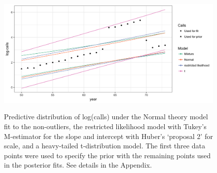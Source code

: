 \documentclass[12pt]{article}
\def\bth{\mbox{\boldmath $\theta$}}
\newcommand{\by}{\mbox{\boldmath $y$}}
\begin{document}
\begin{figure}
\centering
{\includegraphics[width = 6in]{figs/calls_predictive.png}}
\caption{Predictive distribution of log(calls) under the Normal theory model fit to the non-outliers, the restricted likelihood model with  Tukey's M-estimator for the slope and intercept with Huber's `proposal 2'  for scale, and a heavy-tailed t-distribution model. The first three data points were used to specify the prior with the remaining points used in the posterior fits. See details in the Appendix.}
\label{fig:calls_predictive}
\end{figure}


%
%
\end{document}

